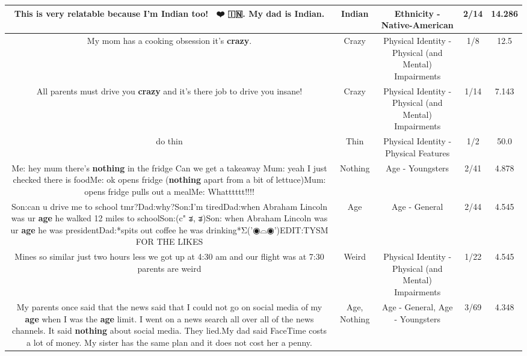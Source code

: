\documentclass[11pt]{article}
\newlength\mylength
\begin{document}
\begin{center}
\begin{longtable}{|C{.65\mylength}|C{.30\mylength}|C{.12\mylength}|C{.12\mylength}|C{.12\mylength}|}
  \small This is very relatable because I'm \textbf{Indian} too! 🤗🤗❤️ 🇮🇳.   My dad is \textbf{Indian}.\normalsize   & Indian & Ethnicity - Native-American & 2/14 & 14.286 \\  \hline
  \small My mom has a cooking obsession it's \textbf{crazy}.\normalsize   & Crazy & Physical Identity - Physical (and Mental) Impairments & 1/8 & 12.5 \\  \hline
  \small All parents must drive you \textbf{crazy} and it's there job to drive you insane!\normalsize   & Crazy & Physical Identity - Physical (and Mental) Impairments & 1/14 & 7.143 \\  \hline
  \small do thin\normalsize   & Thin & Physical Identity - Physical Features & 1/2 & 50.0 \\  \hline
  \small Me: hey mum there's \textbf{nothing} in the fridge Can we get a takeaway Mum: yeah I just checked there is foodMe: ok opens fridge (\textbf{nothing} apart from a bit of lettuce)Mum: opens fridge pulls out a mealMe: Whatttttt!!!!\normalsize   & Nothing & Age - Youngsters & 2/41 & 4.878 \\  \hline
  \small Son:can u drive me to school tmr?Dad:why?Son:I'm tiredDad:when Abraham Lincoln was ur \textbf{age} he walked 12 miles to schoolSon:(c" ತ, ತ)Son: when Abraham Lincoln was ur \textbf{age} he was presidentDad:*spits out coffee he was drinking*Σ('◉⌓◉')EDIT:TYSM FOR THE LIKES\normalsize   & Age & Age - General & 2/44 & 4.545 \\  \hline
  \small Mines so similar just two hours less we got up at 4:30 am and our flight was at 7:30 parents are weird\normalsize   & Weird & Physical Identity - Physical (and Mental) Impairments & 1/22 & 4.545 \\  \hline
  \small My parents once said that the news said that I could not go on social media of my \textbf{age} when I was the \textbf{age} limit. I went on a news search all over all of the news channels. It said \textbf{nothing} about social media. They lied.My dad said FaceTime costs a lot of money. My sister has the same plan and it does not cost her a penny.\normalsize   & Age, Nothing & Age - General, Age - Youngsters & 3/69 & 4.348 \\  \hline

\end{longtable}
\end{center}
\end{document}
